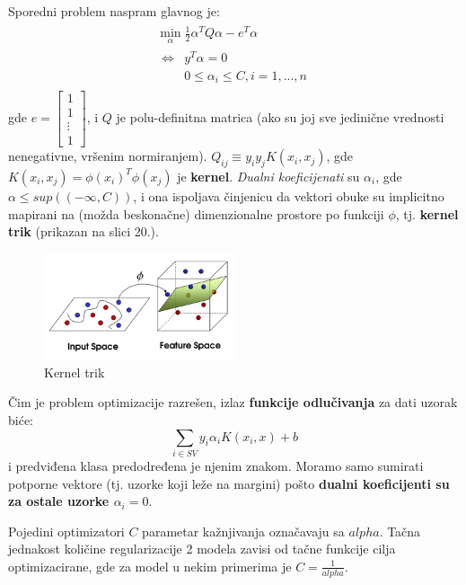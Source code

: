 \documentclass[fontsize=12bp, paper=a4]{scrarticle}
\begin{document}
Sporedni problem naspram glavnog je:
$$
\begin{aligned}\begin{aligned}\min_{\alpha} \frac{1}{2} \alpha^T Q \alpha - e^T \alpha\\\begin{aligned}
    \iff & y^T \alpha = 0\\
    & 0 \leq \alpha_i \leq C, i=1, ..., n\end{aligned}\end{aligned}\end{aligned}
$$
gde $e = \begin{bmatrix}1 \\ 1 \\ \vdots \\ 1\end{bmatrix}$, i $Q$ je polu-definitna matrica (ako su joj sve jedinične vrednosti nenegativne, vršenim normiranjem)\cite{definitemx}. $Q_{ij} \equiv y_i y_j K(x_i, x_j)$, gde $K(x_i, x_j) = \phi (x_i)^T \phi (x_j)$ je \textbf{kernel}. \textit{Dualni koeficijenati} su $\alpha_i$, gde $\alpha \le sup((-\infty, C))$, i ona ispoljava činjenicu da vektori obuke su implicitno mapirani na (možda beskonačne) dimenzionalne prostore po funkciji $\phi$, tj. \textbf{kernel trik} (prikazan na slici 20.).

\begin{figure}[h!]
    \centering
    \includegraphics[width=0.5\textwidth]{image-18.png}
    \caption{Kernel trik}
\end{figure}

Čim je problem optimizacije razrešen, izlaz \textbf{funkcije odlučivanja} za dati uzorak biće:
$$\sum_{i\in SV} y_i \alpha_i K(x_i, x) + b$$
i predviđena klasa predodređena je njenim znakom. Moramo samo sumirati potporne vektore (tj. uzorke koji leže na margini) pošto \textbf{dualni koeficijenti su za ostale uzorke $\alpha_i = 0$}.

\vbox{}
Pojedini optimizatori $C$ parametar kažnjivanja označavaju sa $alpha$. Tačna jednakost količine regularizacije 2 modela zavisi od tačne funkcije cilja optimizacirane, gde za model u nekim primerima je $C = \frac{1}{alpha}$.
\end{document}
